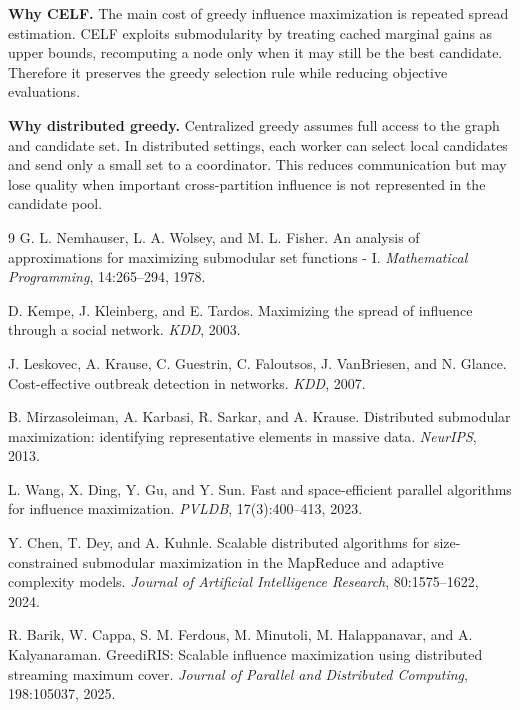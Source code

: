 \documentclass[10pt]{article}
\begin{document}
\textbf{Why CELF.} The main cost of greedy influence maximization is repeated
spread estimation. CELF exploits submodularity by treating cached marginal
gains as upper bounds, recomputing a node only when it may still be the best
candidate. Therefore it preserves the greedy selection rule while reducing
objective evaluations.

\textbf{Why distributed greedy.} Centralized greedy assumes full access to the
graph and candidate set. In distributed settings, each worker can select local
candidates and send only a small set to a coordinator. This reduces
communication but may lose quality when important cross-partition influence is
not represented in the candidate pool.

\begin{thebibliography}{9}
G. L. Nemhauser, L. A. Wolsey, and M. L. Fisher.
An analysis of approximations for maximizing submodular set functions - I.
\emph{Mathematical Programming}, 14:265--294, 1978.

D. Kempe, J. Kleinberg, and E. Tardos.
Maximizing the spread of influence through a social network.
\emph{KDD}, 2003.

J. Leskovec, A. Krause, C. Guestrin, C. Faloutsos, J. VanBriesen, and N. Glance.
Cost-effective outbreak detection in networks.
\emph{KDD}, 2007.

B. Mirzasoleiman, A. Karbasi, R. Sarkar, and A. Krause.
Distributed submodular maximization: identifying representative elements in
massive data.
\emph{NeurIPS}, 2013.

L. Wang, X. Ding, Y. Gu, and Y. Sun.
Fast and space-efficient parallel algorithms for influence maximization.
\emph{PVLDB}, 17(3):400--413, 2023.

Y. Chen, T. Dey, and A. Kuhnle.
Scalable distributed algorithms for size-constrained submodular maximization in
the MapReduce and adaptive complexity models.
\emph{Journal of Artificial Intelligence Research}, 80:1575--1622, 2024.

R. Barik, W. Cappa, S. M. Ferdous, M. Minutoli, M. Halappanavar, and
A. Kalyanaraman.
GreediRIS: Scalable influence maximization using distributed streaming maximum
cover.
\emph{Journal of Parallel and Distributed Computing}, 198:105037, 2025.
\end{thebibliography}
\end{document}
